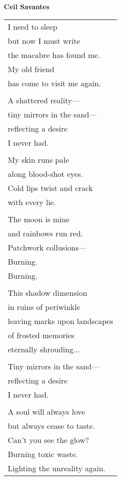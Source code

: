 \documentclass{article}
\begin{document}
\begin{center}
\textbf{Ceil Savantes} \\ %
\vspace*{2ex}
\begin{tabular}{l}
I need to sleep \\
but now I must write \\
the macabre has found me. \\
My old friend \\
has come to visit me again. \\
\\
A shattered reality--- \\
tiny mirrors in the sand--- \\
reflecting a desire \\
I never had. \\
\\
My skin runs pale \\
along blood-shot eyes. \\
Cold lips twist and crack \\
with every lie. \\
\\
The moon is mine \\
and rainbows run red. \\
Patchwork collusions--- \\
Burning. \\
Burning. \\
\\
This shadow dimension \\
in ruins of periwinkle \\
leaving marks upon landscapes \\
of frosted memories \\
eternally shrouding... \\
\\
Tiny mirrors in the sand--- \\
reflecting a desire \\
I never had. \\
\\
A soul will always love \\
but always cease to taste. \\
Can't you see the glow? \\
Burning toxic waste. \\
Lighting the unreality again. \\
\end{tabular}

\end{center}
\end{document}
